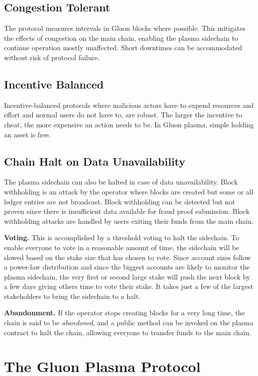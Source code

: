 \documentclass[12pt,a4paper]{article}
\begin{document}
\subsection{Congestion Tolerant}
The protocol measures intervals in Gluon blocks where possible. This mitigates the effects of congestion on the main chain, enabling the plasma sidechain to continue operation mostly unaffected. Short downtimes can be accommodated without risk of protocol failure. 

\subsection{Incentive Balanced}
Incentive-balanced protocols where malicious actors have to expend resources and effort and normal users do not have to, are robust. The larger the incentive to cheat, the more expensive an action needs to be. In Gluon plasma, simple holding an asset is free.

\subsection{Chain Halt on Data Unavailability}
The plasma sidechain can also be halted in case of data unavailability. Block withholding is an attack by the operator where blocks are created but some or all ledger entries are not broadcast. Block withholding can be detected but not proven since there is insufficient data available for fraud proof submission. Block withholding attacks are handled by users exiting their funds from the main chain. 

\textbf{Voting.} This is accomplished by a threshold voting to halt the sidechain. To enable everyone to vote in a reasonable amount of time, the sidechain will be slowed based on the stake size that has chosen to vote. Since account sizes follow a power-law distribution and since the biggest accounts are likely to monitor the plasma sidechain, the very first or second large stake will push the next block by a few days giving others time to vote their stake. It takes just a few of the largest stakeholders to bring the sidechain to a halt.

\textbf{Abandonment.} If the operator stops creating blocks for a very long time, the chain is said to be \emph{abandoned}, and a public method can be invoked on the plasma contract to halt the chain, allowing everyone to transfer funds to the main chain.

\section{The Gluon Plasma Protocol}
\end{document}
